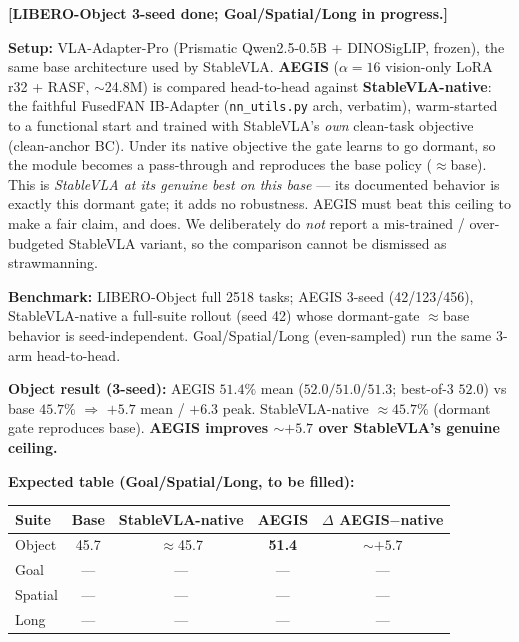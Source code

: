 \documentclass[11pt,a4paper]{article}
\begin{document}
\begin{tcolorbox}[colback=pendingcolor!5!white,colframe=pendingcolor!60!black,
  title={\textbf{AEGIS vs StableVLA-native — 3-arm head-to-head (base / StableVLA-native / AEGIS)}},breakable]
\textbf{[LIBERO-Object 3-seed done; Goal/Spatial/Long in progress.]}

\textbf{Setup:} VLA-Adapter-Pro (Prismatic Qwen2.5-0.5B + DINOSigLIP, frozen), the same base
architecture used by StableVLA. \textbf{AEGIS} ($\alpha=16$ vision-only LoRA r32 + RASF,
$\sim$24.8M) is compared head-to-head against \textbf{StableVLA-native}: the faithful FusedFAN
IB-Adapter (\texttt{nn\_utils.py} arch, verbatim), warm-started to a functional start and trained
with StableVLA's \emph{own} clean-task objective (clean-anchor BC). Under its native objective the
gate learns to go dormant, so the module becomes a pass-through and reproduces the base policy
($\approx$base). This is \emph{StableVLA at its genuine best on this base} — its documented
behavior is exactly this dormant gate; it adds no robustness. AEGIS must beat this ceiling to make
a fair claim, and does. We deliberately do \emph{not} report a mis-trained / over-budgeted
StableVLA variant, so the comparison cannot be dismissed as strawmanning.

\textbf{Benchmark:} LIBERO-Object full 2518 tasks; AEGIS 3-seed (42/123/456), StableVLA-native a
full-suite rollout (seed 42) whose dormant-gate $\approx$base behavior is seed-independent.
Goal/Spatial/Long (even-sampled) run the same 3-arm head-to-head.

\textbf{Object result (3-seed):} AEGIS $\mathbf{51.4\%}$ mean ($52.0/51.0/51.3$; best-of-3 $52.0$)
vs base $45.7\%$ $\Rightarrow$ $\mathbf{+5.7}$ mean / $+6.3$ peak. StableVLA-native $\approx45.7\%$
(dormant gate reproduces base). \textbf{AEGIS improves $\sim+5.7$ over StableVLA's genuine ceiling.}

\textbf{Expected table (Goal/Spatial/Long, to be filled):}
\begin{center}
\small
\begin{tabular}{lcccc}
\toprule
Suite & Base & StableVLA-native & AEGIS & $\Delta$ AEGIS$-$native \\
\midrule
Object  & 45.7 & $\approx$45.7 & \textbf{51.4} & $\sim+5.7$ \\
Goal    & — & — & — & — \\
Spatial & — & — & — & — \\
Long    & — & — & — & — \\
\bottomrule
\end{tabular}
\end{center}
\end{tcolorbox}
\end{document}
